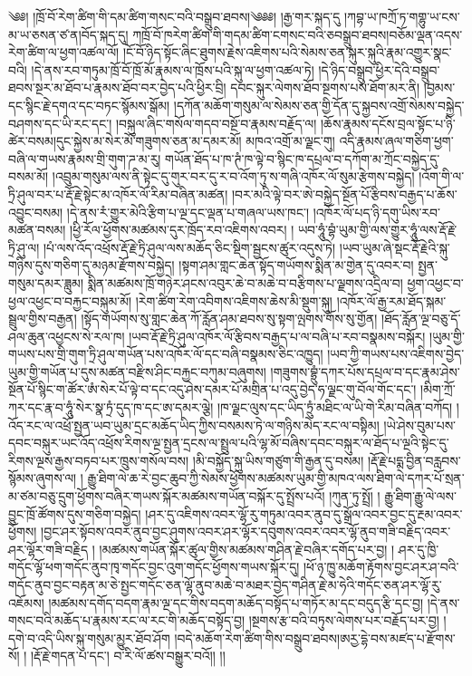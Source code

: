 \setcounter{footnote}{0} 
༄༅། །ཁྲོ་བོ་རེག་ཚིག་གི་དམ་ཚིག་གསང་བའི་བསྒྲུབ་ཐབས།༄༅༅། །རྒྱ་གར་སྐད་དུ །ཀབྷ་ཡ་ཁཀྲོ་ཏ་གགྷུ་ཡ་ངས་མ་ཡ་ཅསན་ཙ་ན།བོད་སྐད་དུ། ཀཁྲོ་བོ་ཁརེག་ཚིག་གི་གདམ་ཚིག་ངགསང་བའི་ཅབསྒྲུབ་ཐབས།བཅོམ་ལྡན་འདས་རེག་ཚིག་ལ་ཕྱག་འཚལ་ལོ། །ངོ་བོ་ཉིད་སྟོང་ཞིང་ཐུགས་རྗེས་འཇིགས་པའི་སེམས་ཅན་སྐུར་སྐུའི་རྣམ་འགྱུར་སྣང་བའི། །དེ་ནས་རབ་གཏུམ་ཁྲོ་བོ་ཁྲོ་མོ་རྣམས་ལ་ཁྲོས་པའི་སྐུ་ལ་ཕྱག་འཚལ་ཏེ། །དེ་ཉིད་བསྒྲུབ་ཕྱིར་དེའི་བསྒྲུབ་ཐབས་སྔར་མ་ཐོབ་པ་རྣམས་ཐོབ་བར་བྱེད་པའི་ཕྱིར་བྲི། དབང་སྐུར་ལེགས་ཐོབ་སྔགས་པས་ཐོག་མར་ནི། །བྱམས་དང་སྙིང་རྗེ་དགའ་དང་བཏང་སྙོམས་སྒོམ། །དཀོན་མཆོག་གསུམ་ལ་སེམས་ཅན་གྱི་དོན་དུ་སྐྱབས་འགྲོ་སེམས་བསྐྱེད་བཤགས་དང་ཡི་རང་དང་། །བསྐུལ་ཞིང་གསོལ་གདབ་བསྔོ་བ་རྣམས་བརྗོད་ལ། །ཆོས་རྣམས་དངོས་བྲལ་སྟོང་པ་ཉི་ཚེར་བསམ།དུང་སྐྱེས་མ་སེར་མོ་གཟུགས་ཅན་མ་དམར་མོ། མཁའ་འགྲོ་མ་ལྗང་གུ། འདི་རྣམས་ཞལ་གཅིག་ཕྱག་བཞི་ལ་གཡས་རྣམས་གྲི་གུག་ཌ་མ་རུ། གཡོན་ཐོད་པ་ཁ་ཊཾ་ཁ་ལྟེ་བ་སྙིང་ཁ་དཔྲལ་བ་དཀོག་མ་ཀྲོང་བསྐྱེད་དུ་བསམ་མོ། །འབྲུམ་གསུམ་ལས་ནི་སྟེང་དུ་གུར་བར་དུ་ར་བ་འོག་ཏུ་ས་གཞི་འཁོར་ལོ་སུམ་རྩེགས་བསྐྱེད། །འོག་གི་ལ་ཏྲི་ཤུལ་བར་པ་རྡོ་རྗེ་སྟེང་མ་འཁོར་ལོ་རིམ་བཞིན་མཚན། །བར་མའི་ལྟེ་བར་ཨེ་བསྐྱེད་སྔོན་པོ་རྩིབས་བརྒྱད་པ་ཆོས་འབྱུང་བསམ། །དེ་ནས་རཾ་གྱུར་མེའི་རྩིག་པ་ལྔ་དང་ལྡན་པ་གཞལ་ཡས་ཁང་། །འཁོར་ལོ་པད་ཉི་དགུ་ཡིས་རབ་མཚན་བསམ། །ཕྱི་རོལ་ཕྱོགས་མཚམས་དུར་ཁྲོད་རབ་འཇིགས་འབར། ། ཡབ་ཧཱུཾ་བྷཾ་ཡུམ་གྱི་ལས་གྱུར་ཧཱུཾ་ལས་རྡོ་རྗེ་ཏྲི་ཤུ་ལ། །པཾ་ལས་འོད་འཕྲོས་རྡོ་རྗེ་ཏྲི་ཤུལ་ལས་མཆོད་ཅིང་སྡིག་སྦྱངས་ཚུར་འདུས་ཏེ། །ཡབ་ཡུམ་ཞེ་སྡང་རྡོ་རྗེའི་སྐུ་གཉིས་དུས་གཅིག་དུ་མཉམ་རྫོགས་བསྐྱེད། །སྟག་ཤམ་གླང་ཆེན་སྟོད་གཡོགས་སྨིན་མ་གྱེན་དུ་འབར་བ། སྤྱན་གསུམ་དམར་ཟླུམ། སྨིན་མཚམས་ཁྲོ་གཉེར་ཤངས་འབུར་ཆེ་བ་མཆེ་བ་བརྩིགས་པ་ལྗགས་འདྲིལ་བ། ཕྱག་འཕྱང་བ་ཕྱལ་འཕྱང་བ་བརྐྱང་བསྐུམ་མོ། །རེག་ཚིག་རེག་འབིགས་འཇིགས་ཆེས་མི་སྡུག་སྐུ། །འཁོར་ལོ་རྒྱ་རམ་ཐོད་སྐམ་སྦྲུལ་གྱིས་བརྒྱན། །སྟོད་གཡོགས་སུ་གླང་ཆེན་ཀོ་རློན་ཤམ་ཐབས་སུ་སྟག་ལྤགས་གོས་སུ་གྱོན། །ཐོད་རློན་ལྔ་བཅུ་དོ་ཤལ་ཆུན་འཕྱངས་སེ་རལ་ཁ། །ཡབ་རྡོ་རྗེ་ཏྲི་ཤུལ་འཁོར་ལོ་རྩིབས་བརྒྱད་པ་ལ་བཞི་པ་རབ་བསྣམས་བསྐོར། །ཡུམ་གྱི་གཡས་པས་གྲི་གུག་ཏྲི་ཤུལ་གཡོན་པས་འཁོར་ལོ་དང་བཞི་བསྣམས་ཅིང་འཁྱུད། །ཡབ་ཀྱི་གཡས་པས་འཇིགས་བྱེད་ཡུམ་གྱི་གཡོན་པ་དུས་མཚན་བརྫིས་ཤིང་བརྐྱང་བཀུམ་བཞུགས། །གཟུགས་བྷྲུཾ་དཀར་པོས་དཔྲལ་བ་དང་རྣམ་ཤེས་སྔོན་པོ་སྙིང་ག་ཚོར་ཨཾ་སེར་པོ་ལྟེ་བ་དང་འདུ་ཤེས་དམར་པོ་མགྲིན་པ་འདུ་བྱེད་ཧ་ལྗང་གུ་བོལ་གོང་དང་། །མིག་ཀྲོ་ཀར་དང་རྣ་བ་ཧཱུཾ་སེར་སྣ་ཏྲཾ་དུད་ཁ་དང་ཨ་དམར་ལྕེ། །ཁ་ལྗང་ལུས་དང་ཡིད་ཏྲུཾ་མཐིང་ལ་ཡི་གེ་རིམ་བཞིན་བཀོད། །འོད་རང་ལ་འཕྲོ་སྤྱན་ཡབ་ཡུམ་དྲང་མཆོད་ཡིད་ཀྱིས་བསམས་ཏེ་ལ་གཉིས་མེད་རང་ལ་བསྟིམ། །ཡེ་ཤེས་བུམ་པས་དབང་བསྐུར་ཡང་འོད་འཕྲོས་རིགས་ལྔ་སྤྱན་དྲངས་ལ་སྤྲུལ་པའི་ལྷ་མོ་བཞིས་དབང་བསྐུར་ལ་ཐོད་པ་ལྔའི་སྟེང་དུ་རིགས་ལྔས་རྒྱས་བཏབ་པར་ཁྲུས་གསོལ་བས། །མི་བསྐྱོད་སྐུ་ཡིས་གཙུག་གི་རྒྱན་དུ་བསམ། །རྡོ་རྗེ་པདྨ་བྱིན་བརླབས་སྙོམས་ཞུགས་ལ། ། རྒྱུ་ཐིག་ལེ་ཆ་རེ་བྱང་ཆུབ་ཀྱི་སེམས་ཕྱོགས་མཚམས་ཡུམ་གྱི་མཁའ་ལས་ཐིག་ལེ་དཀར་པོ་སྲན་མ་ཙམ་བཅུ་དྲུག་ཕྱོགས་བཞིར་གཡས་སྐོར་མཚམས་གཡོན་བསྐོར་དུ་སྤྲོས་པའོ། །ཀུན་ཏུ་སྤྲོ། ། རྒྱུ་ཐིག་རྒྱུ་ལེ་ལས་བྱུང་ཁྲོ་ཚོགས་དུས་གཅིག་བསྐྱེད། །ཤར་དུ་འཇིགས་འབར་ལྷོ་རུ་གཏུམ་འབར་ནུབ་དུ་སྒྲོལ་འབར་བྱང་དུ་རྔམ་འབར་ཕྱོགས། །བྱང་ཤར་སྟོབས་འབར་ནུབ་བྱང་ཤུགས་འབར་ཤར་ལྷོར་དབུགས་འབར་འབར་ལྷོ་ནུབ་གཟི་བརྗིད་འབར་ཤར་ལྷོར་གཟི་བརྗིད ། །མཚམས་གཡོན་སྐོར་ཚུལ་གྱིས་མཚམས་གཤིན་རྗེ་བཞིར་དགོད་པར་བྱ། ། ཤར་དུ་ཁྱི་གདོང་ལྷོ་ཕག་གདོང་ནུབ་ཁྭ་གདོང་བྱང་འུག་གདོང་ཕྱོགས་གཡས་སྐོར་དུ། །ཕོ་ཉ་ཁྱུ་མཆོག་རྟོགས་བྱང་ཤར་ཤ་བའི་གདོང་ནུབ་བྱང་བརྟན་མ་ཅེ་སྤྱང་གདོང་ཅན་ལྷོ་ནུབ་མཆེ་བ་མཐར་བྱེད་གཤིན་རྗེ་མ་ཧེའི་གདོང་ཅན་ཤར་ལྷོ་རུ་འཇོམས། །མཚམས་དགོད་བདག་རྣམ་ལྔ་དང་གིས་བདག་མཆོད་བསྟོད་པ་གཏོར་མ་དང་བདུད་རྩི་དང་བྱ། །དེ་ནས་གསང་བའི་མཆོད་པ་རྣམས་རང་ལ་རང་གི་མཆོད་བསྟོད་བྱ། །སྔགས་རྩ་བའི་བཏུས་ལེགས་པར་བརྗོད་པར་བྱ། །དགེ་བ་འདི་ཡིས་སྐུ་གསུམ་མྱུར་ཐོབ་ཤོག །བདེ་མཆོག་རེག་ཚིག་གིས་བསྒྲུབ་ཐབས།ཨརྱ་དྷེ་བས་མཛད་པ་རྫོགས་སོ། ། །རྡོ་རྗེ་གདན་པ་དང་། བ་རི་ལོ་ཚས་བསྒྱུར་བའོ།། །།